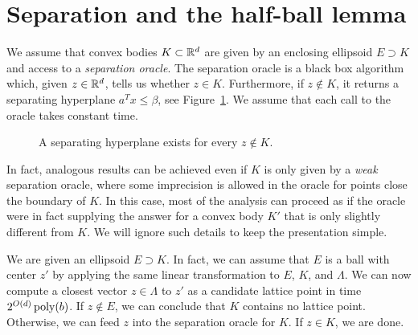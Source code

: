 \section{Separation and the half-ball lemma}

We assume that convex bodies $K \subset \mathbb{R}^d$ are given by an enclosing ellipsoid $E \supset K$
and access to a \emph{separation oracle}.
The separation oracle is a black box algorithm which, given $z \in \mathbb{R}^d$,
tells us whether $z \in K$.
Furthermore, if $z \not\in K$, it returns a separating hyperplane $a^Tx \leq \beta$,
see Figure~\ref{fig:separating-hyperplane}.
We assume that each call to the oracle takes constant time.
\begin{figure}
  \begin{center}
  \end{center}
  \caption{A separating hyperplane exists for every $z \not\in K$.}
  \label{fig:separating-hyperplane}
\end{figure}

\begin{remark}
  In fact, analogous results can be achieved even if $K$ is only given by a \emph{weak} separation oracle,
  where some imprecision is allowed in the oracle for points close the boundary of $K$.
  In this case, most of the analysis can proceed as if the oracle were in fact supplying the answer
  for a convex body $K'$ that is only slightly different from $K$.
  We will ignore such details to keep the presentation simple.
\end{remark}

We are given an ellipsoid $E \supset K$.
In fact, we can assume that $E$ is a ball with center $z'$
by applying the same linear transformation to $E$, $K$, and $\Lambda$.
We can now compute a closest vector $z \in \Lambda$ to $z'$ as a candidate lattice point
in time $2^{O(d)} \operatorname{poly}(b)$.
If $z \not\in E$, we can conclude that $K$ contains no lattice point.
Otherwise, we can feed $z$ into the separation oracle for $K$.
If $z \in K$, we are done.

